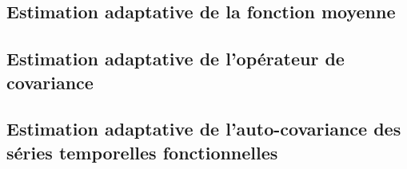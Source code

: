 \subsection{Estimation adaptative de la fonction moyenne}




\subsection{Estimation adaptative de l'opérateur de covariance}



\subsection{Estimation adaptative de l'auto-covariance des séries temporelles fonctionnelles}

